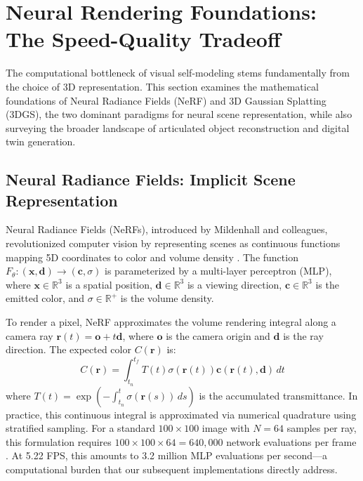 \documentclass[12pt,a4paper,oneside]{report}
\begin{document}
\section{Neural Rendering Foundations: The Speed-Quality Tradeoff}

The computational bottleneck of visual self-modeling stems fundamentally from the choice of 3D representation. This section examines the mathematical foundations of Neural Radiance Fields (NeRF) and 3D Gaussian Splatting (3DGS), the two dominant paradigms for neural scene representation, while also surveying the broader landscape of articulated object reconstruction and digital twin generation.

\subsection{Neural Radiance Fields: Implicit Scene Representation}

Neural Radiance Fields (NeRFs), introduced by Mildenhall and colleagues, revolutionized computer vision by representing scenes as continuous functions mapping 5D coordinates to color and volume density \cite{mildenhall2020nerf}. The function $F_\theta: (\mathbf{x}, \mathbf{d}) \rightarrow (\mathbf{c}, \sigma)$ is parameterized by a multi-layer perceptron (MLP), where $\mathbf{x} \in \mathbb{R}^3$ is a spatial position, $\mathbf{d} \in \mathbb{R}^3$ is a viewing direction, $\mathbf{c} \in \mathbb{R}^3$ is the emitted color, and $\sigma \in \mathbb{R}^+$ is the volume density.

To render a pixel, NeRF approximates the volume rendering integral along a camera ray $\mathbf{r}(t) = \mathbf{o} + t\mathbf{d}$, where $\mathbf{o}$ is the camera origin and $\mathbf{d}$ is the ray direction. The expected color $C(\mathbf{r})$ is:
\begin{equation}
C(\mathbf{r}) = \int_{t_n}^{t_f} T(t) \sigma(\mathbf{r}(t)) \mathbf{c}(\mathbf{r}(t), \mathbf{d}) \, dt
\end{equation}
where $T(t) = \exp\left(-\int_{t_n}^{t} \sigma(\mathbf{r}(s)) \, ds\right)$ is the accumulated transmittance. In practice, this continuous integral is approximated via numerical quadrature using stratified sampling. For a standard $100 \times 100$ image with $N = 64$ samples per ray, this formulation requires $100 \times 100 \times 64 = 640,000$ network evaluations per frame \cite{mildenhall2020nerf}. At 5.22 FPS, this amounts to 3.2 million MLP evaluations per second---a computational burden that our subsequent implementations directly address.
\end{document}
